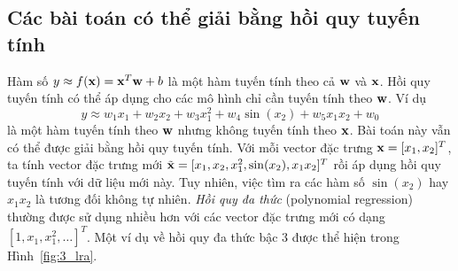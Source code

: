 \subsection{Các bài toán có thể giải bằng hồi quy tuyến tính}
Hàm số $y \approx f(\mathbf{x})= \mathbf{x}^T\mathbf{w} + b$ là một hàm tuyến tính
theo cả $ \mathbf{w}$ và $\mathbf{x}$. Hồi quy tuyến tính có thể áp
dụng cho các mô hình chỉ cần tuyến tính theo $\mathbf{w}$. Ví dụ
\begin{equation}
y \approx w_1 x_1 + w_2 x_2 + w_3 x_1^2 +w_4 \sin(x_2) + w_5 x_1x_2 + w_0
\end{equation}
là một hàm tuyến tính theo $\mathbf{w}$ nhưng không tuyến tính theo $\mathbf{x}$. Bài toán này vẫn có thể được giải bằng
hồi quy tuyến tính. Với mỗi vector đặc trưng $\mathbf{x}=[x_1, x_2]^T $, ta
tính vector đặc trưng mới $\tilde{\mathbf{x}} = [x_1, x_2, x_1^2,
\sin(x_2), x_1x_2]^T$ rồi áp dụng hồi quy tuyến tính với dữ liệu mới này. Tuy
nhiên, việc tìm ra các hàm số $\sin(x_2)$ hay $x_1x_2$ là tương đối
{không tự nhiên}. \textit{Hồi quy đa thức} (polynomial regression) thường được sử dụng nhiều hơn với các vector đặc trưng mới có dạng
$[1, x_1, x_1^2, \dots]^T$. Một ví dụ về hồi quy đa thức bậc 3 được thể hiện
trong Hình~\ref{fig:3_lra}.



